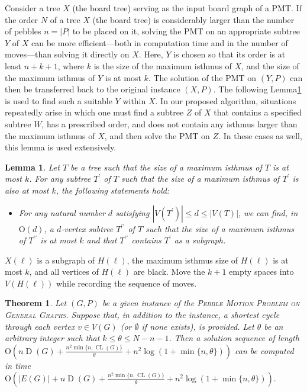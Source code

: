 \documentclass[10pt,a4paper]{amsart}
\newtheorem{thm}{Theorem}
\newtheorem{la}{Lemma}
\DeclareMathOperator{\CL}{CL}
\DeclareMathOperator{\D}{D}
\newcommand{\Ord}{\mathrm{O}}
\newcommand{\tume}{\hspace*{0.2em}}
\begin{document}
Consider a tree $X$ (the board tree) serving as the input board graph of a PMT. 
If the order $N$ of a tree $X$ (the board tree) is considerably larger than the number of pebbles $n = |P|$ 
to be placed on it, solving the PMT on an appropriate subtree $Y$ of $X$ can be more efficient---both 
in computation time and in the number of moves---than solving it directly on $X$. Here, $Y$ is chosen 
so that its order is at least $n + k + 1$, where $k$ is the size of the maximum isthmus of $X$, and 
the size of the maximum isthmus of $Y$ is at most $k$. The solution of the PMT on $(Y, P)$ can 
then be transferred back to the original instance $(X, P)$. 
The following Lemma\tume\ref{feasible-subtree} is used to find such a suitable $Y$ within $X$. 
In our proposed algorithm, situations repeatedly arise in which one must find a subtree $Z$ of $X$ 
that contains a specified subtree $W$, has a prescribed order, and does not contain any isthmus 
larger than the maximum isthmus of $X$, and then solve the PMT on $Z$. In these cases as well, 
this lemma is used extensively. 
\begin{la}\label{feasible-subtree}
Let $T$ be a tree such that the size of a maximum isthmus of $T$ is at most $k$. 
For any subtree $T^{\prime}$ of $T$ such that the size of a maximum isthmus of $T^{\prime}$ is also at most $k$, the following statements hold:
\begin{itemize}
\item For any natural number $d$ satisfying $|V(T^{\prime})| \leq d \leq |V(T)|$, 
we can find, in $\Ord(d)$, a $d$-vertex subtree $T^{\prime\prime}$ of $T$ such that the size of a maximum isthmus 
of $T^{\prime\prime}$ is at most $k$ and that $T^{\prime\prime}$ contains $T^{\prime}$ 
as a subgraph.
\end{itemize}
\end{la}

$X(\ell)$ is a subgraph of $H(\ell)$,
the maximum isthmus size of $H(\ell)$ is at most $k$,
and all vertices of $H(\ell)$ are black.
Move the $k+1$ empty spaces into $V(H(\ell))$
while recording the sequence of moves.
\label{mini-puzzle}

\begin{thm}\label{main2}
Let $(G, P)$ be a given instance of the \textsc{Pebble Motion Problem on General Graphs}.  
Suppose that, in addition to the instance, %
a shortest cycle through each vertex $v \in V(G)$ (or $\emptyset$ if none exists), 
is provided. 
Let $\theta$ be an arbitrary integer such that $k \leq \theta \leq N - n - 1$.
Then a solution sequence of length 
$\Ord(n\D(G)+\frac{n^2\min\{n,\CL(G)\}}{\theta}+n^2\log(1+\min\{n, \theta\}))$ 
can be computed in time %
$\Ord(|E(G)|+n\D(G)+\frac{n^2\min\{n,\CL(G)\}}{\theta}+n^2\log(1+\min\{n, \theta\})).$ 
\end{thm}
\end{document}
